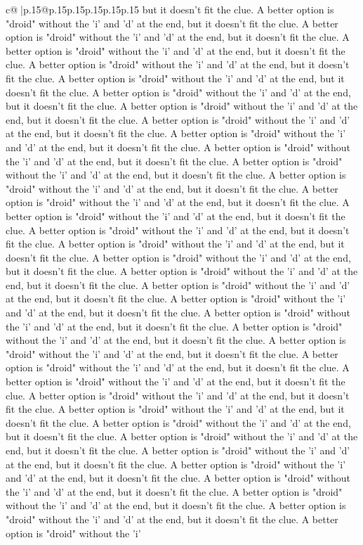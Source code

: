 \documentclass{article}
\begin{document}
{\begin{supertabular}{c@{$\;$}|p{.15\linewidth}@{}p{.15\linewidth}p{.15\linewidth}p{.15\linewidth}p{.15\linewidth}p{.15\linewidth}}
{{{but it doesn't fit the clue. A better option is "droid" without the 'i' and 'd' at the end, but it doesn't fit the clue. A better option is "droid" without the 'i' and 'd' at the end, but it doesn't fit the clue. A better option is "droid" without the 'i' and 'd' at the end, but it doesn't fit the clue. A better option is "droid" without the 'i' and 'd' at the end, but it doesn't fit the clue. A better option is "droid" without the 'i' and 'd' at the end, but it doesn't fit the clue. A better option is "droid" without the 'i' and 'd' at the end, but it doesn't fit the clue. A better option is "droid" without the 'i' and 'd' at the end, but it doesn't fit the clue. A better option is "droid" without the 'i' and 'd' at the end, but it doesn't fit the clue. A better option is "droid" without the 'i' and 'd' at the end, but it doesn't fit the clue. A better option is "droid" without the 'i' and 'd' at the end, but it doesn't fit the clue. A better option is "droid" without the 'i' and 'd' at the end, but it doesn't fit the clue. A better option is "droid" without the 'i' and 'd' at the end, but it doesn't fit the clue. A better option is "droid" without the 'i' and 'd' at the end, but it doesn't fit the clue. A better option is "droid" without the 'i' and 'd' at the end, but it doesn't fit the clue. A better option is "droid" without the 'i' and 'd' at the end, but it doesn't fit the clue. A better option is "droid" without the 'i' and 'd' at the end, but it doesn't fit the clue. A better option is "droid" without the 'i' and 'd' at the end, but it doesn't fit the clue. A better option is "droid" without the 'i' and 'd' at the end, but it doesn't fit the clue. A better option is "droid" without the 'i' and 'd' at the end, but it doesn't fit the clue. A better option is "droid" without the 'i' and 'd' at the end, but it doesn't fit the clue. A better option is "droid" without the 'i' and 'd' at the end, but it doesn't fit the clue. A better option is "droid" without the 'i' and 'd' at the end, but it doesn't fit the clue. A better option is "droid" without the 'i' and 'd' at the end, but it doesn't fit the clue. A better option is "droid" without the 'i' and 'd' at the end, but it doesn't fit the clue. A better option is "droid" without the 'i' and 'd' at the end, but it doesn't fit the clue. A better option is "droid" without the 'i' and 'd' at the end, but it doesn't fit the clue. A better option is "droid" without the 'i' and 'd' at the end, but it doesn't fit the clue. A better option is "droid" without the 'i' and 'd' at the end, but it doesn't fit the clue. A better option is "droid" without the 'i' and 'd' at the end, but it doesn't fit the clue. A better option is "droid" without the 'i' and 'd' at the end, but it doesn't fit the clue. A better option is "droid" without the 'i' and 'd' at the end, but it doesn't fit the clue. A better option is "droid" without the 'i' and 'd' at the end, but it doesn't fit the clue. A better option is "droid" without the 'i' and 'd' at the end, but it doesn't fit the clue. A better option is "droid" without the 'i' and 'd' at the end, but it doesn't fit the clue. A better option is "droid" without the 'i' }}}
\end{supertabular}}
\end{document}
